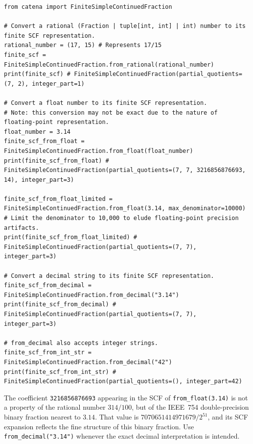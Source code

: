 \begin{catenadef}
\begin{lstlisting}[style=python]
from catena import FiniteSimpleContinuedFraction

# Convert a rational (Fraction | tuple[int, int] | int) number to its finite SCF representation.
rational_number = (17, 15) # Represents 17/15
finite_scf = FiniteSimpleContinuedFraction.from_rational(rational_number)
print(finite_scf) # FiniteSimpleContinuedFraction(partial_quotients=(7, 2), integer_part=1)

# Convert a float number to its finite SCF representation.
# Note: this conversion may not be exact due to the nature of floating-point representation.
float_number = 3.14
finite_scf_from_float = FiniteSimpleContinuedFraction.from_float(float_number)
print(finite_scf_from_float) # FiniteSimpleContinuedFraction(partial_quotients=(7, 7, 3216856876693, 14), integer_part=3)

finite_scf_from_float_limited = FiniteSimpleContinuedFraction.from_float(3.14, max_denominator=10000) # Limit the denominator to 10,000 to elude floating-point precision artifacts.
print(finite_scf_from_float_limited) # FiniteSimpleContinuedFraction(partial_quotients=(7, 7), integer_part=3)

# Convert a decimal string to its finite SCF representation.
finite_scf_from_decimal = FiniteSimpleContinuedFraction.from_decimal("3.14")
print(finite_scf_from_decimal) # FiniteSimpleContinuedFraction(partial_quotients=(7, 7), integer_part=3)

# from_decimal also accepts integer strings.
finite_scf_from_int_str = FiniteSimpleContinuedFraction.from_decimal("42")
print(finite_scf_from_int_str) # FiniteSimpleContinuedFraction(partial_quotients=(), integer_part=42)
\end{lstlisting}
\end{catenadef}

\begin{remark}
  The coefficient \texttt{3216856876693} appearing in the SCF of \texttt{from\_float(3.14)} is not
  a property of the rational number $314/100$, but of the IEEE~754 double-precision binary fraction
  nearest to $3.14$.  That value is $7070651414971679 / 2^{51}$, and its SCF expansion reflects
  the fine structure of this binary fraction.  Use \texttt{from\_decimal("3.14")} whenever the
  exact decimal interpretation is intended.
\end{remark}

